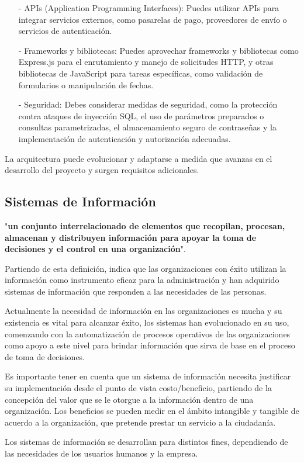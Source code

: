 \documentclass[12pt,a4paper]{article}
\newcommand{\espacio}{\par\vspace{3mm}}
\newcommand{\newsubsection}[1]{\subsection{\hspace{4mm} #1}}
\begin{document}
\begin{itemize}
    \item[-] APIs (Application Programming Interfaces): Puedes utilizar APIs para integrar servicios externos, como pasarelas de pago, proveedores de envío o servicios de autenticación.
    \item[-] Frameworks y bibliotecas: Puedes aprovechar frameworks y bibliotecas como Express.js para el enrutamiento y manejo de solicitudes HTTP, y otras bibliotecas de JavaScript para tareas específicas, como validación de formularios o manipulación de fechas.
    \item[-] Seguridad: Debes considerar medidas de seguridad, como la protección contra ataques de inyección SQL, el uso de parámetros preparados o consultas parametrizadas, el almacenamiento seguro de contraseñas y la implementación de autenticación y autorización adecuadas.
\end{itemize}
    
La arquitectura puede evolucionar y adaptarse a medida que avanzas en el desarrollo del proyecto y surgen requisitos adicionales. 

\newsubsection{Sistemas de Información}
"\textbf{un conjunto interrelacionado de elementos que recopilan, procesan, almacenan y distribuyen información para apoyar la toma de decisiones y el control en una organización}".
\cite{kendall}
\espacio
Partiendo de esta definición, indica que las organizaciones con éxito utilizan la información como instrumento eficaz para la administración y han adquirido sistemas de información que responden a las necesidades de las personas.
\espacio Actualmente la necesidad de información en las organizaciones es mucha y su existencia es vital para alcanzar éxito, los sistemas han evolucionado en su uso, comenzando con la automatización de procesos operativos de las organizaciones como apoyo a este nivel para brindar información que sirva de base en el proceso de toma de decisiones.
\espacio Es importante tener en cuenta que un sistema de información necesita justificar su implementación desde el punto de vista costo/beneficio, partiendo de la concepción del valor que se le otorgue a la información dentro de una organización. Los beneficios se pueden medir en el ámbito intangible y tangible de acuerdo a la organización, que pretende prestar un servicio a la ciudadanía.
\espacio Los sistemas de información se desarrollan para distintos fines, dependiendo de las necesidades de los usuarios humanos y la empresa.
\end{document}
